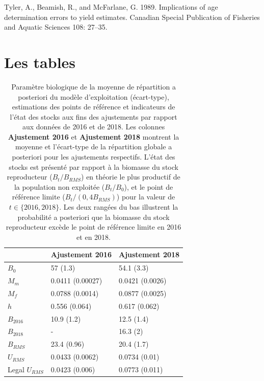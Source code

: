 \documentclass[11pt]{book}
\begin{document}
\leavevmode\hypertarget{ref-tyler1989implications}{}%
Tyler, A., Beamish, R., and McFarlane, G. 1989. Implications of age determination errors to yield estimates. Canadian Special Publication of Fisheries and Aquatic Sciences 108: 27--35.

\setlength{\parindent}{0in} 
\setlength{\leftskip}{0in} 
\setlength{\parskip}{4pt}

\setcounter{table}{0}

\hypertarget{les-tables}{%
\section{Les tables}\label{les-tables}}

\begingroup\fontsize{12}{14}\selectfont
\begingroup\fontsize{12}{14}\selectfont
\begin{longtable}[t]{lll}
\caption{\label{tab:unnamed-chunk-5}Paramètre biologique de la moyenne de répartition a posteriori du modèle d’exploitation (écart-type), estimations des points de référence et indicateurs de l’état des stocks aux fins des ajustements par rapport aux données de 2016 et de 2018. Les colonnes \textbf{Ajustement 2016} et \textbf{Ajustement 2018} montrent la moyenne et l’écart-type de la répartition globale a posteriori pour les ajustements respectifs. L’état des stocks est présenté par rapport à la biomasse du stock reproducteur ($B_t/B_{RMS}$) en théorie le plus productif de la population non exploitée ($B_t/B_0 $), et le point de référence limite ($B_t/(0,4B_{RMS})$) pour la valeur de $t \in \{2016, 2018\}$. Les deux rangées du bas illustrent la probabilité a posteriori que la biomasse du stock reproducteur excède le point de référence limite en 2016 et en 2018.}\\
\toprule
\textbf{ } & \textbf{Ajustement 2016} & \textbf{Ajustement 2018}\\
\midrule
$B_0$ & 57 (1.3) & 54.1 (3.3)\\
$M_m$ & 0.0411 (0.00027) & 0.0421 (0.0026)\\
$M_f$ & 0.0788 (0.0014) & 0.0877 (0.0025)\\
$h$ & 0.556 (0.064) & 0.617 (0.062)\\
$B_{2016}$ & 10.9 (1.2) & 12.5 (1.4)\\
$B_{2018}$ & - & 16.3 (2)\\
$B_{RMS}$ & 23.4 (0.96) & 20.4 (1.7)\\
$U_{RMS}$ & 0.0433 (0.0062) & 0.0734 (0.01)\\
Legal $U_{RMS}$ & 0.0423 (0.006) & 0.0773 (0.011)\\

\end{longtable}
\end{document}
